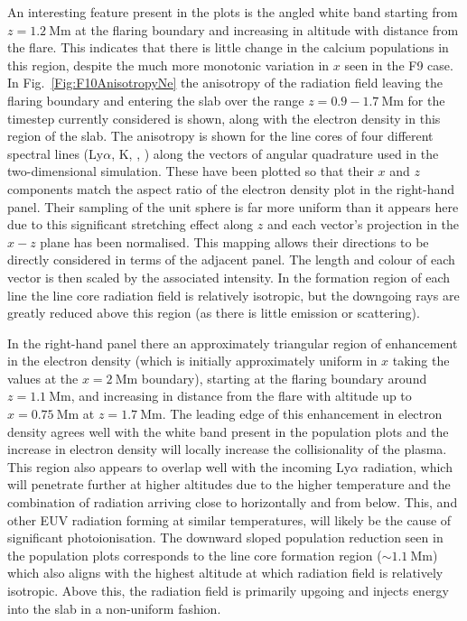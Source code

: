 An interesting feature present in the \Caii{} plots is the angled white band starting from $z=\SI{1.2}{\mega\metre}$ at the flaring boundary and increasing in altitude with distance from the flare.
This indicates that there is little change in the calcium populations in this region, despite the much more monotonic variation in $x$ seen in the F9 case.
In Fig.~\ref{Fig:F10AnisotropyNe} the anisotropy of the radiation field leaving the flaring boundary and entering the slab over the range $z=0.9-\SI{1.7}{\mega\metre}$ for the timestep currently considered is shown, along with the electron density in this region of the slab.
The anisotropy is shown for the line cores of four different spectral lines (Ly$\alpha$, \Caii{} K, \Ha{}, \CaLine{}) along the vectors of angular quadrature used in the two-dimensional simulation.
These have been plotted so that their $x$ and $z$ components match the aspect ratio of the electron density plot in the right-hand panel.
Their sampling of the unit sphere is far more uniform than it appears here due to this significant stretching effect along $z$ and each vector's projection in the $x-z$ plane has been normalised.
This mapping allows their directions to be directly considered in terms of the adjacent panel.
The length and colour of each vector is then scaled by the associated intensity.
In the formation region of each line the line core radiation field is relatively isotropic, but the downgoing rays are greatly reduced above this region (as there is little emission or scattering).

In the right-hand panel there an approximately triangular region of enhancement in the electron density (which is initially approximately uniform in $x$ taking the values at the $x=\SI{2}{\mega\metre}$ boundary), starting at the flaring boundary around $z=\SI{1.1}{\mega\metre}$, and increasing in distance from the flare with altitude up to $x=\SI{0.75}{\mega\metre}$ at $z=\SI{1.7}{\mega\metre}$.
The leading edge of this enhancement in electron density agrees well with the white band present in the \Caii{} population plots and the increase in electron density will locally increase the collisionality of the plasma.
This region also appears to overlap well with the incoming Ly$\alpha$ radiation, which will penetrate further at higher altitudes due to the higher temperature and the combination of radiation arriving close to horizontally and from below.
This, and other EUV radiation forming at similar temperatures, will likely be the cause of significant photoionisation.
The downward sloped population reduction seen in the \Caii{} population plots corresponds to the line core formation region ($\sim\SI{1.1}{\mega\metre}$) which also aligns with the highest altitude at which \CaLine{} radiation field is relatively isotropic.
Above this, the radiation field is primarily upgoing and injects energy into the slab in a non-uniform fashion.

